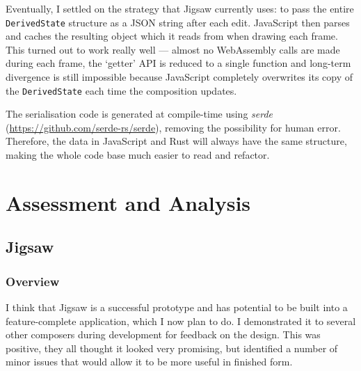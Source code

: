 \documentclass[12pt]{article}
\begin{document}
Eventually, I settled on the strategy that Jigsaw currently uses:  to pass the entire
\verb|DerivedState| structure as a JSON string after each edit.  JavaScript then parses and caches
the resulting object which it reads from when drawing each frame.  This turned out to work really
well --- almost no WebAssembly calls are made during each frame, the `getter' API is reduced to a
single function and long-term divergence is still impossible because JavaScript completely
overwrites its copy of the \verb|DerivedState| each time the composition updates.

The serialisation code is generated at compile-time using \emph{serde}
(\url{https://github.com/serde-rs/serde}), removing the possibility for human error.  Therefore, the
data in JavaScript and Rust will always have the same structure, making the whole code base much
easier to read and refactor.



\pagebreak

\section{Assessment and Analysis}

\subsection{Jigsaw}

\subsubsection{Overview}

I think that Jigsaw is a successful prototype and has potential to be built into a  feature-complete
application, which I now plan to do. I demonstrated it to several other composers during development
for feedback on the design.  This was positive, they all thought it looked very promising, but
identified a number of minor issues that would allow it to be more useful in finished form.
\end{document}
